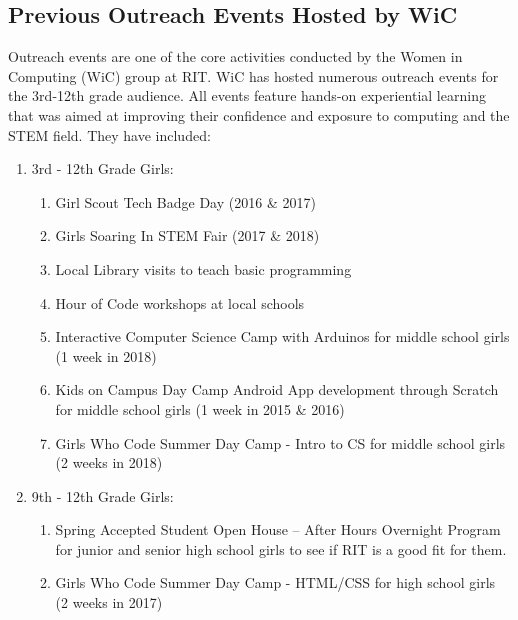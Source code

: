 \documentclass[12pt]{article}
\newcommand{\dan}[1]{\textcolor{blue}{{\it [Dan says: #1]}}}
\begin{document}




\subsection{Previous Outreach Events Hosted by WiC}

Outreach events are one of the core activities conducted by the Women in Computing (WiC) group at RIT. WiC has hosted numerous outreach events for the 3rd-12th grade audience. All events feature hands-on experiential learning that was aimed at improving their confidence and exposure to computing and the STEM field. They have included: 
 
 
\begin{enumerate}[noitemsep]
\item 3rd - 12th Grade Girls:
    \begin{enumerate}[noitemsep]
        \item Girl Scout Tech Badge Day (2016 \& 2017)
        \item Girls Soaring In STEM Fair (2017 \& 2018)
        \item  Local Library visits to teach basic programming
        \item Hour of Code workshops at local schools
        \item Interactive Computer Science Camp with Arduinos for middle school girls (1 week in 2018)
        \item Kids on Campus Day Camp Android App development through Scratch for middle school girls (1 week in 2015 \& 2016)
        \item Girls Who Code Summer Day Camp - Intro to CS for middle school girls (2 weeks in 2018)
    \end{enumerate}

\item 9th - 12th  Grade Girls:
    \begin{enumerate}[noitemsep]
        \item Spring Accepted Student Open House –  After Hours Overnight Program for junior and senior high school girls to see if RIT is a good fit for them.
        \item Girls Who Code Summer Day Camp - HTML/CSS for high school girls (2 weeks in 2017)
    \end{enumerate}


\end{enumerate}
 
\end{document}
